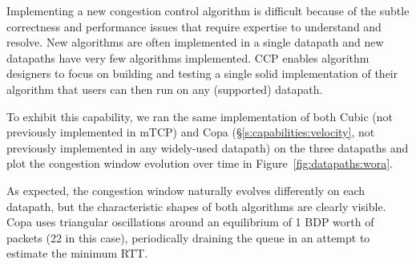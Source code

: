 Implementing a new congestion control algorithm is difficult because of the subtle correctness and performance issues that require expertise to understand and resolve. New algorithms are often implemented in a single datapath and new datapaths have very few algorithms implemented. 
CCP enables algorithm designers to focus on building and testing a single solid implementation of their algorithm that users can then run on any (supported) datapath. 

To exhibit this capability, we ran the same implementation of both Cubic (not previously implemented in mTCP) and Copa (\S\ref{s:capabilities:velocity}, not previously implemented in any widely-used datapath) on the three datapaths and plot the congestion window evolution over time in Figure~\ref{fig:datapaths:wora}.

As expected, the congestion window naturally evolves differently on each datapath, but the characteristic shapes of both algorithms are clearly visible. Copa uses triangular oscillations around an equilibrium of 1 BDP worth of packets (22 in this case), periodically draining the queue in an attempt to estimate the minimum RTT.

